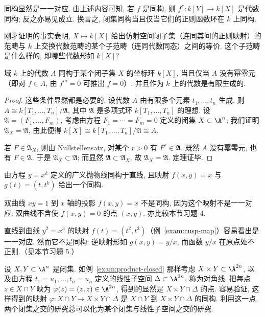 同构显然是一一对应. 由上述内容可知, 若 $f$ 是同构, 则 $f^*: k[Y] \to k[X]$ 是代数同构; 反之亦易见成立. 换言之, 闭集同构当且仅当它们的正则函数环在 $k$ 上同构.

刚才证明的事实表明, $X \mapsto k[X]$ 给出仿射空间闭子集（连同其间的正则映射）的范畴与 $k$ 上交换代数范畴的某个子范畴（连同代数同态）之间的等价. 这个子范畴是什么样的, 即哪些代数形如 $k[X]$?

\begin{theorem}\label{thm:coordinate-ring-char}
	域 $k$ 上的代数 $A$ 同构于某个闭子集 $X$ 的坐标环 $k[X]$, 当且仅当 $A$ 没有幂零元（即对 $f \in A$, 由 $f^m = 0$ 可推出 $f = 0$）, 并且作为 $k$ 上的代数是有限生成的.
\end{theorem}

\begin{proof}
	这些条件显然都是必要的. 设代数 $A$ 由有限多个元素 $t_1, \ldots, t_n$ 生成, 则 $A \cong k[T_1, \ldots, T_n]/\mathfrak A$, 其中 $\mathfrak A$ 是多项式环 $k[T_1, \ldots, T_n]$ 的理想. 设 $\mathfrak A = (F_1, \ldots, F_m)$, 考虑由方程 $F_1 = \cdots = F_m = 0$ 定义的闭集 $X \subset \A^n$; 我们证明 $\mathfrak A_X = \mathfrak A$, 由此便得 $k[X] \cong k[T_1, \ldots, T_n]/\mathfrak A \cong A$.

	若 $F \in \mathfrak A_X$, 则由 Nullstellensatz, 对某个 $r > 0$ 有 $F^r \in \mathfrak A$. 既然 $A$ 没有幂零元, 也有 $F \in \mathfrak A$. 于是 $\mathfrak A_X \subset \mathfrak A$; 而显然 $\mathfrak A \subset \mathfrak A_X$, 故 $\mathfrak A_X = \mathfrak A$. 定理证毕.
\end{proof}

\begin{example}\label{exam:parabola-iso}
	由方程 $y = x^k$ 定义的广义抛物线同构于直线, 且映射 $f(x, y) = x$ 与 $g(t) = (t, t^k)$ 给出一个同构.
\end{example}

\begin{example}\label{exam:hyperbola-not-iso}
	双曲线 $xy = 1$ 到 $x$ 轴的投影 $f(x, y) = x$ 不是同构, 因为这个映射不是一一对应: 双曲线不含使 $f(x, y) = 0$ 的点 $(x, y)$. 亦比较本节习题 4.
\end{example}

\begin{example}\label{exam:cusp-not-iso}
	直线到曲线 $y^2 = x^3$ 的映射 $f(t) = (t^2, t^3)$（例~\ref{exam:cusp-map}）容易看出是一一对应. 然而它不是同构: 逆映射形如 $g(x, y) = y/x$, 而函数 $y/x$ 在原点处不正则.（见本节习题 5.）
\end{example}

\begin{example}\label{exam:diagonal}
	设 $X, Y \subset \A^n$ 是闭集. 如例~\ref{exam:product-closed} 那样考虑 $X \times Y \subset \A^{2n}$, 以及由方程 $t_1 = u_1, \ldots, t_n = u_n$ 定义的线性子空间 $\Delta \subset \A^{2n}$, 称为对角线. 把每点 $z \in X \cap Y$ 映为 $\varphi(z) = (z, z) \in \A^{2n}$, 得到的显然是 $X \times Y \cap \Delta$ 的点. 容易验证, 这样得到的映射 $\varphi: X \cap Y \to X \times Y \cap \Delta$ 是 $X \cap Y$ 到 $X \times Y \cap \Delta$ 的同构. 利用这一点, 两个闭集之交的研究总可以化为某个闭集与线性子空间之交的研究.
\end{example}

